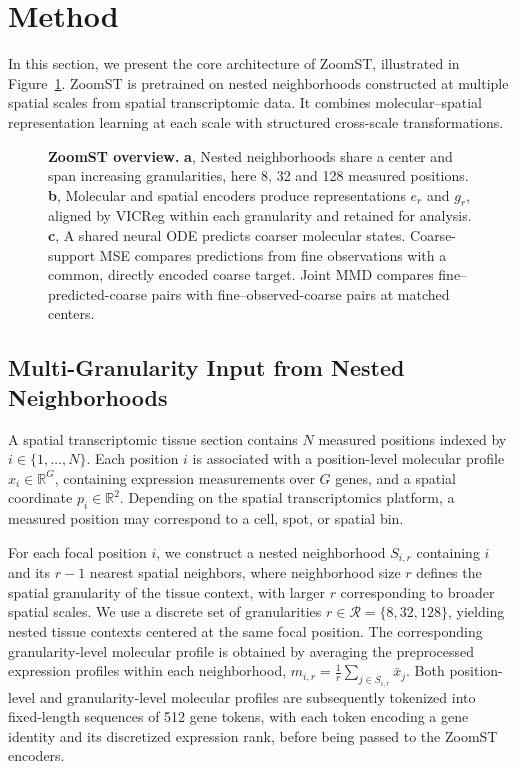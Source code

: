 \section{Method}
\label{sec:method}
\label{sec:backbone}

In this section, we present the core architecture of ZoomST, illustrated in Figure~\ref{fig:method}. ZoomST is pretrained on nested neighborhoods constructed at multiple spatial scales from spatial transcriptomic data. It combines molecular--spatial representation learning at each scale with structured cross-scale transformations.

\begin{figure}[t]
\centering
\resizebox{0.90\linewidth}{!}{}
\caption{\textbf{ZoomST overview.}
\textbf{a}, Nested neighborhoods share a center and span increasing granularities, here 8, 32 and 128 measured positions.
\textbf{b}, Molecular and spatial encoders produce representations $e_r$ and $g_r$, aligned by VICReg within each granularity and retained for analysis.
\textbf{c}, A shared neural ODE predicts coarser molecular states. Coarse-support MSE compares predictions from fine observations with a common, directly encoded coarse target. Joint MMD compares fine--predicted-coarse pairs with fine--observed-coarse pairs at matched centers.}
\label{fig:method}
\end{figure}

\subsection{Multi-Granularity Input from Nested Neighborhoods}
\label{sec:nested-observations}

A spatial transcriptomic tissue section contains $N$ measured positions indexed by $i\in\{1,\ldots,N\}$. Each position $i$ is associated with a position-level molecular profile $x_i\in\mathbb{R}^{G}$, containing expression measurements over $G$ genes, and a spatial coordinate $p_i\in\mathbb{R}^{2}$. Depending on the spatial transcriptomics platform, a measured position may correspond to a cell, spot, or spatial bin.

For each focal position $i$, we construct a nested neighborhood $S_{i,r}$ containing $i$ and its $r-1$ nearest spatial neighbors, where neighborhood size $r$ defines the spatial granularity of the tissue context, with larger $r$ corresponding to broader spatial scales. We use a discrete set of granularities $r\in\mathcal{R}=\{8,32,128\}$, yielding nested tissue contexts centered at the same focal position. The corresponding granularity-level molecular profile is obtained by averaging the preprocessed expression profiles within each neighborhood, $m_{i,r}=\frac{1}{r}\sum_{j\in S_{i,r}}\bar{x}_j$.
Both position-level and granularity-level molecular profiles are subsequently tokenized into fixed-length sequences of 512 gene tokens, with each token encoding a gene identity and its discretized expression rank, before being passed to the ZoomST encoders.

